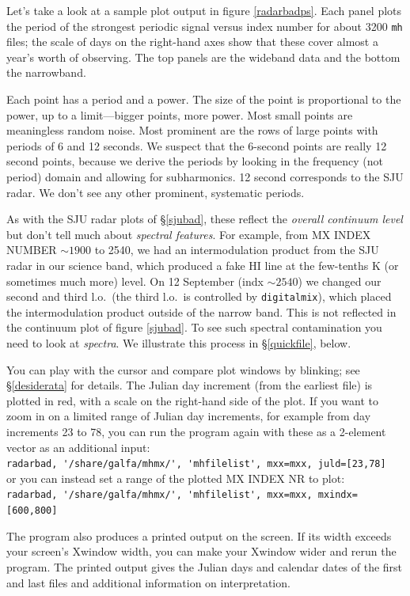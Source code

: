 \documentclass[psfig,preprint]{aastex}
\begin{document}
	Let's take a look at a sample plot output in figure
\ref{radarbadps}.  Each panel plots the period of the strongest periodic
signal versus index number for about 3200 \verb$mh$ files; the scale of
days on the right-hand axes show that these cover almost a year's worth
of observing.  The top panels are the wideband data and the bottom the
narrowband. 

	Each point has a period and a power. The size of the point is
proportional to the power, up to a limit---bigger points, more power.
Most small points are meaningless random noise. Most prominent are the
rows of large points with periods of 6 and 12 seconds. We suspect that
the 6-second points are really 12 second points, because we derive the
periods by looking in the frequency (not period) domain and allowing for
subharmonics. 12 second corresponds to the SJU radar. We don't see any
other prominent, systematic periods.

	As with the SJU radar plots of \S \ref{sjubad}, these reflect
the {\it overall continuum level} but don't tell much about {\it
spectral features}.  For example, from MX INDEX NUMBER $\sim 1900$ to
2540, we had an intermodulation product from the SJU radar in our
science band, which produced a fake HI line at the few-tenths K (or
sometimes much more) level.  On 12 September (indx $\sim 2540$) we
changed our second and third l.o.\ (the third l.o.\ is controlled by
\verb$digitalmix$), which placed the intermodulation product outside of
the narrow band.  This is not reflected in the continuum plot of figure
\ref{sjubad}.  To see such spectral contamination you need to look at
{\it spectra}.  We illustrate this process in \S \ref{quickfile}, below. 

		You can play with the cursor and compare plot windows by
blinking; see \S \ref{desiderata} for details.  
The Julian day increment (from the earliest file) is plotted in
red, with a scale on the right-hand side of the plot. If you want to
zoom in on a limited range of Julian day increments, for example from
day increments 23 to 78, you can run the program again with these as a
2-element vector as an additional input: \\
\verb$radarbad, '/share/galfa/mhmx/', 'mhfilelist', mxx=mxx, juld=[23,78]$ \\
or you can instead set a range of the plotted MX INDEX NR to plot: \\
\verb$radarbad, '/share/galfa/mhmx/', 'mhfilelist', mxx=mxx, mxindx=[600,800]$ 

	The program also produces a printed output on the screen. If its
width exceeds your screen's Xwindow width, you can make your Xwindow
wider and rerun the program. The printed output gives the Julian days
and calendar dates of the first and last files and additional information
on interpretation. 
\end{document}
